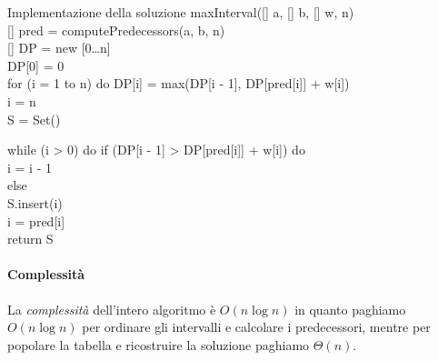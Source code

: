 \begin{minicode}{Implementazione della soluzione}
\ind{} maxInterval([] a, [] b, [] w,  n)\\
    [] pred = computePredecessors(a, b, n)\\
    [] DP = new [0\dots n]\\
    DP[0] = 0\\
    \indf for (i = 1 to n) do\hfill{}
        DP[i] = max(DP[i - 1], DP[pred[i]] + w[i])\\
    \indf{} i = n\\
    \indf{} S = Set()\\
\end{minicode}
\begin{codecont}
    \indent while (i > 0) do\hfill{}
        \indf if (DP[i - 1] > DP[pred[i]] + w[i]) do\\
            \indff i = i - 1\\
    \rmindent\indent else\\
            \indff S.insert(i)\\
            \indff i = pred[i]\\
    \ind return S
\end{codecont}

\paragraph{Complessità}
La \emph{complessità} dell'intero algoritmo è $O(n\log n)$ in quanto paghiamo
$O(n\log n)$ per ordinare gli intervalli e calcolare i predecessori, mentre per
popolare la tabella e ricostruire la soluzione paghiamo $\Theta(n)$.